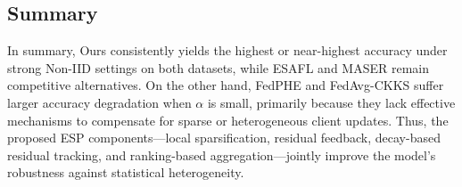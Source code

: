 \documentclass{article}
\begin{document}
\subsection{Summary}

In summary, Ours consistently yields the highest or near-highest accuracy under strong Non-IID settings on both datasets, while ESAFL and MASER remain competitive alternatives.
On the other hand, FedPHE and FedAvg-CKKS suffer larger accuracy degradation when $\alpha$ is small, primarily because they lack effective mechanisms to compensate for sparse or heterogeneous client updates.
Thus, the proposed ESP components---local sparsification, residual feedback, decay-based residual tracking, and ranking-based aggregation---jointly improve the model's robustness against statistical heterogeneity.
\end{document}
